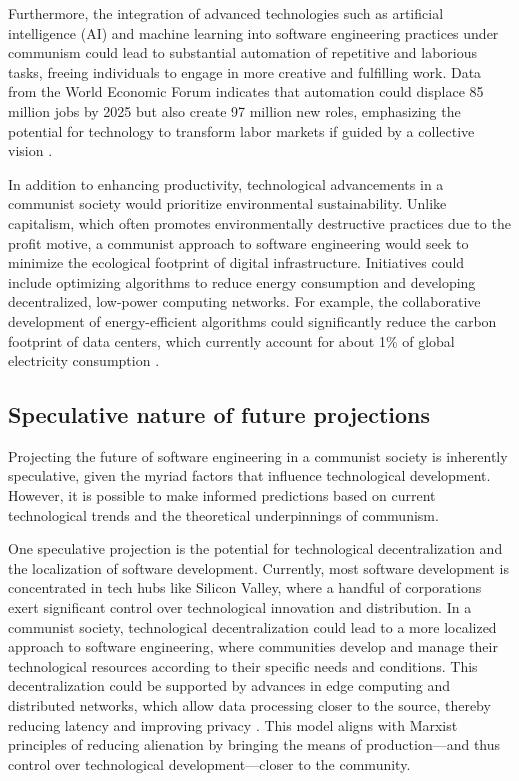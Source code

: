 Furthermore, the integration of advanced technologies such as artificial intelligence (AI) and machine learning into software engineering practices under communism could lead to substantial automation of repetitive and laborious tasks, freeing individuals to engage in more creative and fulfilling work. Data from the World Economic Forum indicates that automation could displace 85 million jobs by 2025 but also create 97 million new roles, emphasizing the potential for technology to transform labor markets if guided by a collective vision \cite[pp.~9-12]{WEF2020}.

In addition to enhancing productivity, technological advancements in a communist society would prioritize environmental sustainability. Unlike capitalism, which often promotes environmentally destructive practices due to the profit motive, a communist approach to software engineering would seek to minimize the ecological footprint of digital infrastructure. Initiatives could include optimizing algorithms to reduce energy consumption and developing decentralized, low-power computing networks. For example, the collaborative development of energy-efficient algorithms could significantly reduce the carbon footprint of data centers, which currently account for about 1\% of global electricity consumption \cite[pp.~58-61]{IEA2021}.

\subsection{Speculative nature of future projections}

Projecting the future of software engineering in a communist society is inherently speculative, given the myriad factors that influence technological development. However, it is possible to make informed predictions based on current technological trends and the theoretical underpinnings of communism.

One speculative projection is the potential for technological decentralization and the localization of software development. Currently, most software development is concentrated in tech hubs like Silicon Valley, where a handful of corporations exert significant control over technological innovation and distribution. In a communist society, technological decentralization could lead to a more localized approach to software engineering, where communities develop and manage their technological resources according to their specific needs and conditions. This decentralization could be supported by advances in edge computing and distributed networks, which allow data processing closer to the source, thereby reducing latency and improving privacy \cite[pp.~145-148]{EdgeAI2022}. This model aligns with Marxist principles of reducing alienation by bringing the means of production—and thus control over technological development—closer to the community.

